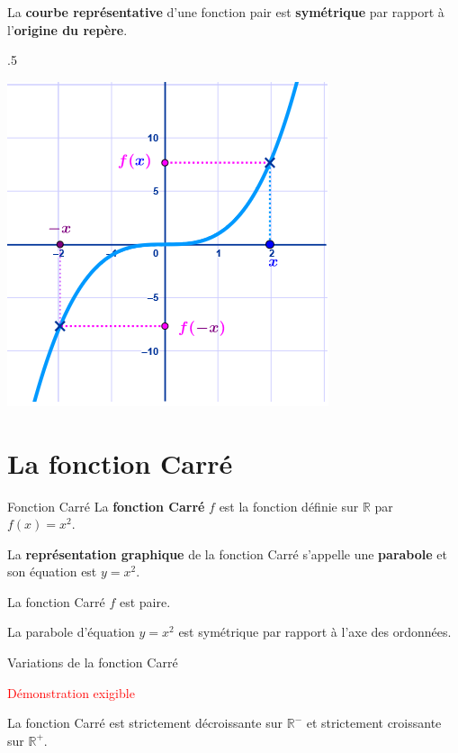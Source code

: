 \begin{pageCours}
{\begin{Rq}
La \textbf{courbe représentative} d'une fonction pair est \textbf{symétrique} par rapport à l'\textbf{origine du repère}.
\end{Rq}
}{.5\linewidth}{
\begin{center}
\includegraphics[width=.6\linewidth]{FIG/fonction_impaire.png} 
\end{center}
}

\section{La fonction Carré}

\begin{DefT}{Fonction Carré}
La \textbf{fonction Carré} $f$ est la fonction définie sur $\mathbb{R}$ par $f(x)=x^2$.
 
La \textbf{représentation graphique} de la fonction Carré s'appelle une \textbf{parabole} et son équation est $y=x^2$. 
\end{DefT}

\begin{minipage}{0.48\linewidth}
\begin{Th} 
La fonction Carré $f$ est paire.

La parabole d'équation $y=x^2$ est symétrique par rapport à l'axe des ordonnées.
\end{Th}

\begin{ThT}{Variations de la fonction Carré}

\textcolor{red}{Démonstration exigible}

La fonction Carré est strictement décroissante sur $\mathbb{R}^-$ et strictement croissante sur $\mathbb{R}^+$. 


\end{ThT}
\end{minipage}
\end{pageCours}
